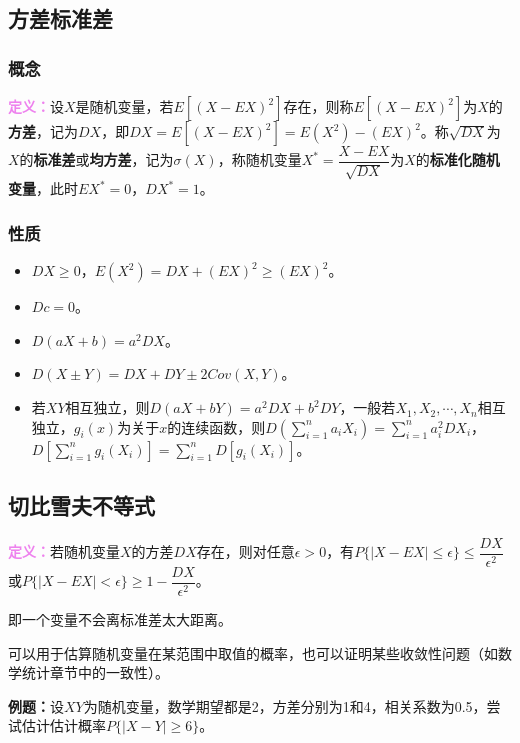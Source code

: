 \documentclass[UTF8, 12pt]{ctexart}
\begin{document}
\subsection{方差标准差}

\subsubsection{概念}

\textcolor{violet}{\textbf{定义：}}设$X$是随机变量，若$E[(X-EX)^2]$存在，则称$E[(X-EX)^2]$为$X$的\textbf{方差}，记为$DX$，即$DX=E[(X-EX)^2]=E(X^2)-(EX)^2$。称$\sqrt{DX}$为$X$的\textbf{标准差}或\textbf{均方差}，记为$\sigma(X)$，称随机变量$X^*=\dfrac{X-EX}{\sqrt{DX}}$为$X$的\textbf{标准化随机变量}，此时$EX^*=0$，$DX^*=1$。

\subsubsection{性质}

\begin{itemize}
    \item $DX\geqslant0$，$E(X^2)=DX+(EX)^2\geqslant(EX)^2$。
    \item $Dc=0$。
    \item $D(aX+b)=a^2DX$。
    \item $D(X\pm Y)=DX+DY\pm2Cov(X,Y)$。
    \item 若$XY$相互独立，则$D(aX+bY)=a^2DX+b^2DY$，一般若$X_1,X_2,\cdots,X_n$相互独立，$g_i(x)$为关于$x$的连续函数，则$D\left(\sum\limits_{i=1}^na_iX_i\right)=\sum\limits_{i=1}^na_i^2DX_i$，$D\left[\sum\limits_{i=1}^ng_i(X_i)\right]=\sum\limits_{i=1}^nD[g_i(X_i)]$。
\end{itemize}

\subsection{切比雪夫不等式}

\textcolor{violet}{\textbf{定义：}}若随机变量$X$的方差$DX$存在，则对任意$\epsilon>0$，有$P\{\vert X-EX\vert\leqslant\epsilon\}\leqslant\dfrac{DX}{\epsilon^2}$或$P\{\vert X-EX\vert<\epsilon\}\geqslant1-\dfrac{DX}{\epsilon^2}$。

即一个变量不会离标准差太大距离。

可以用于估算随机变量在某范围中取值的概率，也可以证明某些收敛性问题（如数学统计章节中的一致性）。

\textbf{例题：}设$XY$为随机变量，数学期望都是2，方差分别为1和4，相关系数为0.5，尝试估计估计概率$P\{\vert X-Y\vert\geqslant6\}$。
\end{document}
